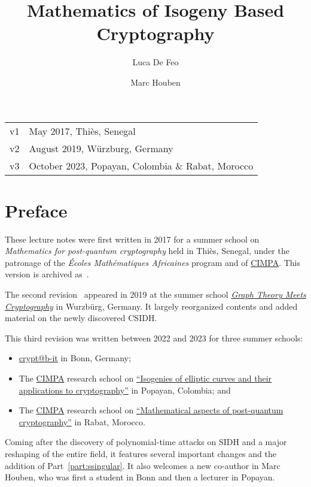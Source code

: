 \documentclass[10pt]{article}
\title{Mathematics of Isogeny Based Cryptography}
\author{Luca De Feo}
\affil{
  \textcolor{gray}{Université de Versailles, France}\\
  \textcolor{gray}{Inria Saclay, Palaiseau, France}\\
  IBM Research Europe, Z\"urich, Switzerland\\
  \url{https://defeo.lu/}
}
\author{Marc Houben}
\affil{
  Universiteit Leiden, Netherlands\\
  KU Leuven, Belgium
}
\date{}
\theoremstyle{plain}
\theoremstyle{definition}
\begin{document}
\maketitle

\begin{center}
  \begin{tabular}{r @{~--~} l}
    \color{gray}v1 & \color{gray}May 2017, Thi\`es, Senegal\\
    \color{gray}v2 & \color{gray}August 2019, W\"urzburg, Germany\\
    v3 & October 2023, Popayan, Colombia \& Rabat, Morocco
  \end{tabular}
\end{center}

\thispagestyle{fancy}
\renewcommand{\headrulewidth}{0pt}
\renewcommand{\footrulewidth}{0.4pt}
\cfoot{}

\section*{Preface}

These lecture notes were first written in 2017 for a summer school on
\emph{Mathematics for post-quantum cryptography} held in Thiès,
Senegal, under the patronage of the \emph{\'Ecoles Math\'ematiques
  Africaines} program and of \href{https://www.cimpa.info/}{CIMPA}.
This version is archived as~\cite{defeo2017isogenybased}.

The second revision~\cite{defeo2017isogenybased} appeared in 2019 at
the summer school
\href{https://ifm.mathematik.uni-wuerzburg.de/summerschool2019/}{\emph{Graph
    Theory Meets Cryptography}} in Wurzb\"urg, Germany. %
It largely reorganized contents and added material on the newly
discovered CSIDH. %

This third revision was written between 2022 and 2023 for three summer
schools:
\begin{itemize}
\item \href{https://cryptabit.bit.uni-bonn.de/2022}{crypt@b-it} in
  Bonn, Germany;
\item The \href{https://www.cimpa.info/}{CIMPA} research school on
  \href{http://www.rnta.eu/Popayan2023/}{``Isogenies of elliptic
    curves and their applications to cryptography''} in Popayan,
  Colombia; and
\item The \href{https://www.cimpa.info/}{CIMPA} research school on
  \href{http://cimpa.c2si-conference.org/}{``Mathematical aspects of
    post-quantum cryptography''} in Rabat, Morocco.
\end{itemize}
Coming after the discovery of polynomial-time attacks on SIDH and a
major reshaping of the entire field, it features several important
changes and the addition of Part~\ref{part:ssingular}. %
It also welcomes a new co-author in Marc Houben, who was first a
student in Bonn and then a lecturer in Popayan.
\end{document}
